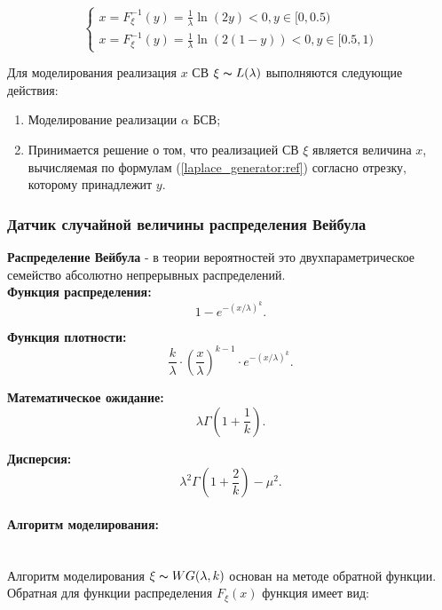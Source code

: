 \begin{equation}
	\begin{cases}
		x = F_{\xi}^{-1}(y) = \frac{1}{\lambda}\ln(2y) < 0, y \in [0, 0.5)\\
		x = F_{\xi}^{-1}(y) = \frac{1}{\lambda}\ln(2(1-y)) < 0, y \in [0.5, 1)
		\label{laplace_generator:ref}
	\end{cases}
\end{equation}

Для моделирования реализация $x$ СВ $\xi \thicksim L(\lambda)$ выполняются следующие действия:
\begin{enumerate}
	\item Моделирование реализации $\alpha$ БСВ;
	\item Принимается решение о том, что реализацией СВ $\xi$ является величина $x$, вычисляемая по формулам (\ref{laplace_generator:ref}) согласно отрезку, которому принадлежит $y$.
\end{enumerate}

\subsubsection{Датчик случайной величины распределения Вейбула}

\textbf{Распределение Вейбула} - в теории вероятностей это двухпараметрическое семейство абсолютно непрерывных распределений.\\

\textbf{Функция распределения:}
\begin{equation}
	1-e^{-(x/\lambda)^{k}}.
\end{equation}

\textbf{Функция плотности:}
\begin{equation}
	\frac{k}{\lambda} \cdot \left(\frac{x}{\lambda}\right)^{k-1} \cdot e^{-(x/\lambda)^{k}}.
\end{equation}

\textbf{Математическое ожидание:}
\begin{equation}
	\lambda\Gamma\left(1+\frac{1}{k}\right).
\end{equation}

\textbf{Дисперсия:}
\begin{equation}
	\lambda^{2}\Gamma\left(1+\frac{2}{k}\right) - \mu^{2}.
\end{equation}

\paragraph{Алгоритм моделирования:}\
\\
Алгоритм моделирования $\xi \thicksim WG(\lambda, k)$ основан на методе обратной функции. Обратная для функции распределения $F_{\xi}(x)$ функция имеет вид:

